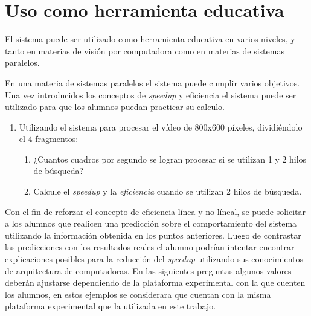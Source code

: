 
\section{Uso como herramienta educativa}

\label{usoEducativo}

El sistema puede ser utilizado como herramienta educativa en varios niveles, y
tanto en materias de visión por computadora como en materias de sistemas
paralelos.

En una materia de sistemas paralelos el sistema puede cumplir varios objetivos.
Una vez introducidos los conceptos de \emph{speedup} y eficiencia el sistema
puede ser utilizado para que los alumnos puedan practicar su calculo.

\begin{enumerate}

	\item{Utilizando el sistema para procesar el vídeo de 800x600 píxeles,
		dividiéndolo el 4 fragmentos:

\begin{enumerate}

	\item{¿Cuantos cuadros por segundo se logran procesar si se utilizan 1 y
		2 hilos de búsqueda?}

	\item{Calcule el \emph{speedup} y la \emph{eficiencia} cuando se
		utilizan 2 hilos de búsqueda.}

\end{enumerate}}

\end{enumerate}

Con el fin de reforzar el concepto de eficiencia línea y no líneal, se puede
solicitar a los alumnos que realicen una predicción sobre el comportamiento del
sistema utilizando la información obtenida en los puntos anteriores. Luego de
contrastar las predicciones con los resultados reales el alumno podrían intentar
encontrar explicaciones posibles para la reducción del \emph{speedup} utilizando
sus conocimientos de arquitectura de computadoras. En las siguientes preguntas
algunos valores deberán ajustarse dependiendo de la plataforma experimental con
la que cuenten los alumnos, en estos ejemplos se considerara que cuentan con la
misma plataforma experimental que la utilizada en este trabajo.

